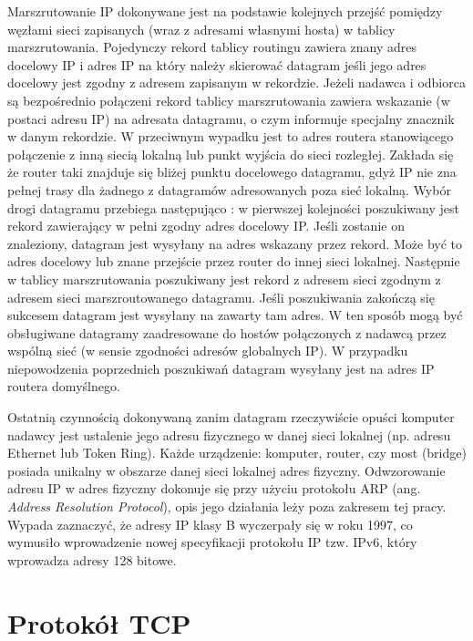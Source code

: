 Marszrutowanie IP dokonywane jest na podstawie kolejnych przejść pomiędzy węzłami sieci zapisanych (wraz z 
adresami własnymi hosta) w tablicy marszrutowania. Pojedynczy rekord tablicy routingu zawiera znany adres 
docelowy IP i adres IP na który należy skierować datagram jeśli jego adres docelowy jest zgodny z adresem 
zapisanym w rekordzie. Jeżeli nadawca i odbiorca są bezpośrednio połączeni rekord tablicy marszrutowania zawiera 
wskazanie (w postaci adresu IP) na adresata datagramu, o czym informuje specjalny znacznik w danym rekordzie. 
W przeciwnym wypadku jest to adres routera stanowiącego połączenie z inną siecią lokalną lub punkt wyjścia do 
sieci rozległej. Zakłada się że router taki znajduje się bliżej punktu docelowego datagramu, gdyż IP nie zna 
pełnej trasy dla żadnego z datagramów adresowanych poza sieć lokalną. Wybór drogi datagramu przebiega 
następująco \cite{barylo2}: 
w pierwszej kolejności poszukiwany jest rekord zawierający w pełni zgodny adres docelowy IP. Jeśli zostanie on 
znaleziony, datagram jest wysyłany na adres wskazany przez rekord. Może być to adres docelowy lub znane 
przejście przez router do innej sieci lokalnej.
Następnie w tablicy marszrutowania  poszukiwany jest rekord z adresem sieci zgodnym z adresem sieci 
marszroutowanego datagramu. Jeśli poszukiwania zakończą się sukcesem datagram jest wysyłany na zawarty tam adres. 
W ten sposób mogą być obsługiwane  datagramy zaadresowane do hostów połączonych z nadawcą przez wspólną sieć 
(w sensie zgodności adresów globalnych IP). 
W przypadku niepowodzenia poprzednich poszukiwań datagram wysyłany jest na adres IP routera domyślnego.

Ostatnią czynnością dokonywaną zanim datagram rzeczywiście opuści komputer nadawcy jest ustalenie jego adresu 
fizycznego w danej sieci lokalnej (np. adresu Ethernet lub Token Ring). Każde urządzenie: komputer, router, czy 
most (bridge) posiada unikalny w obszarze danej sieci lokalnej adres fizyczny. Odwzorowanie adresu IP w adres fizyczny 
dokonuje się przy użyciu protokołu ARP (ang. \emph{Address Resolution Protocol}), opis jego działania leży poza 
zakresem tej pracy.
Wypada zaznaczyć, że adresy IP klasy B wyczerpały się w roku 1997, co wymusiło wprowadzenie nowej specyfikacji
protokołu IP tzw. IPv6, który wprowadza adresy 128 bitowe. 

\section{Protokół TCP}

